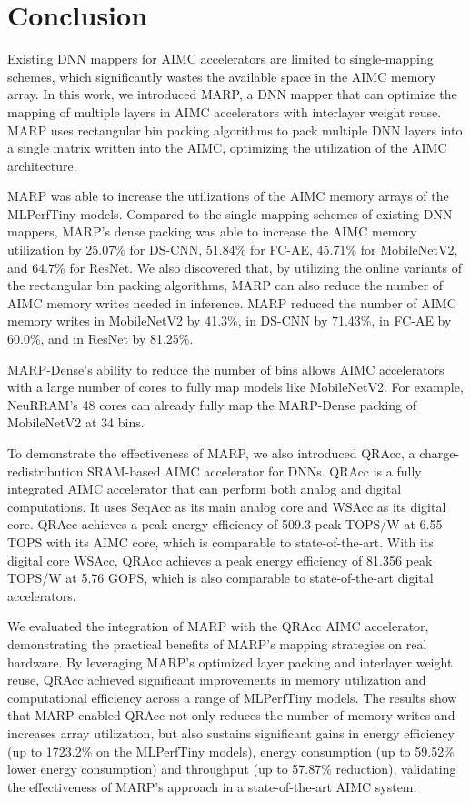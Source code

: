 \section{Conclusion}

Existing DNN mappers for AIMC accelerators are limited to single-mapping schemes, which significantly wastes the available space in the AIMC memory array. In this work, we introduced MARP, a DNN mapper that can optimize the mapping of multiple layers in AIMC accelerators with interlayer weight reuse. MARP uses rectangular bin packing algorithms to pack multiple DNN layers into a single matrix written into the AIMC, optimizing the utilization of the AIMC architecture.

MARP was able to increase the utilizations of the AIMC memory arrays of the MLPerfTiny models. Compared to the single-mapping schemes of existing DNN mappers, MARP's dense packing was able to increase the AIMC memory utilization by 25.07\% for DS-CNN, 51.84\% for FC-AE, 45.71\% for MobileNetV2, and 64.7\% for ResNet. 
We also discovered that, by utilizing the online variants of the rectangular bin packing algorithms, MARP can also reduce the number of AIMC memory writes needed in inference. MARP reduced the number of AIMC memory writes in MobileNetV2 by 41.3\%, in DS-CNN by 71.43\%, in FC-AE by 60.0\%, and in ResNet by 81.25\%.

MARP-Dense's ability to reduce the number of bins allows AIMC accelerators with a large number of cores to fully map models like MobileNetV2. For example, NeuRRAM's 48 cores can already fully map the MARP-Dense packing of MobileNetV2 at 34 bins. 

To demonstrate the effectiveness of MARP, we also introduced QRAcc, a charge-redistribution SRAM-based AIMC accelerator for DNNs. QRAcc is a fully integrated AIMC accelerator that can perform both analog and digital computations. It uses SeqAcc as its main analog core and WSAcc as its digital core. QRAcc achieves a peak energy efficiency of 509.3 peak TOPS/W at 6.55 TOPS with its AIMC core, which is comparable to state-of-the-art. With its digital core WSAcc, QRAcc achieves a peak energy efficiency of 81.356 peak TOPS/W at 5.76 GOPS, which is also comparable to state-of-the-art digital accelerators.

We evaluated the integration of MARP with the QRAcc AIMC accelerator, demonstrating the practical benefits of MARP’s mapping strategies on real hardware. By leveraging MARP’s optimized layer packing and interlayer weight reuse, QRAcc achieved significant improvements in memory utilization and computational efficiency across a range of MLPerfTiny models. The results show that MARP-enabled QRAcc not only reduces the number of memory writes and increases array utilization, but also sustains significant gains in energy efficiency (up to 1723.2\% on the MLPerfTiny models), energy consumption (up to 59.52\% lower energy consumption) and throughput (up to 57.87\% reduction), validating the effectiveness of MARP’s approach in a state-of-the-art AIMC system.

